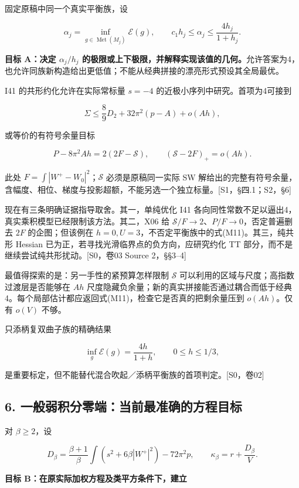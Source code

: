 \documentclass[UTF8,a4paper,11pt,fontset=fandol]{ctexart}
\begin{document}
固定原稿中同一个真实平衡族，设

\[
\alpha_j=\inf_{g\in\operatorname{Met}(M_j)}\mathcal E(g),\qquad
c_1h_j\le\alpha_j\le\frac{4h_j}{1+h_j}.
\]

\textbf{目标 A：决定 \(\alpha_j/h_j\)
的极限或上下极限，并解释实现该值的几何。}允许答案为4，也允许同族新构造给出更低值；不能从经典拼接的漂亮形式预设其全局最优。

I41 的共形约化允许在实际常标量 \(s=-4\)
的近极小序列中研究。首项为4可接到

\[
\Sigma\le\frac89D_2+32\pi^2(p-A)+o(Ah),
\tag{M10}
\]

或等价的有符号余量目标

\[
P-8\pi^2Ah=2(2F-\mathscr S),
\qquad
\boxed{(\mathscr S-2F)_+=o(Ah)}.
\tag{M11}
\]

此处 \(F=\int|W^+-W_0|^2\)；\(\mathscr S\) 必须是原稿同一实际 SW
解给出的完整有符号余量，含幅度、相位、梯度与投影超额，不能另选一个独立标量。{[}S1，§四.1；S2，§6{]}

现在有三条明确证据指导取舍。其一，单纯优化 I41
各向同性常数不足以逼出4，真实乘积模型已经限制该方法。其二，X06 给
\(\mathscr S/F\to2\)、\(P/F\to0\)，否定普遍删去 \(2F\) 的企图；但该例在
\(h=0,U=3\)，不否定平衡族中的式(M11)。其三，纯共形 Hessian
已为正，若寻找光滑临界点的负方向，应研究约化 TT
部分，而不是继续尝试纯共形扰动。{[}S0，卷03 Source 2，§§3--4{]}

最值得探索的是：另一手性的紧预算怎样限制 \(\mathscr S\)
可以利用的区域与尺度；高指数过渡层是否能够在 \(Ah\)
尺度隐藏负余量；新的真实拼接能否通过耦合而低于经典4。每个局部估计都应返回式(M11)，检查它是否真的把剩余量压到
\(o(Ah)\)。仅有 \(o(V)\) 不够。

只添柄复双曲子族的精确结果

\[
\inf_g\mathcal E(g)=\frac{4h}{1+h},\qquad0\le h\le1/3,
\]

是重要标定，但不能替代混合吹起／添柄平衡族的首项判定。{[}S0，卷02{]}

\subsection{6.
一般弱积分零端：当前最准确的方程目标}\label{ux4e00ux822cux5f31ux79efux5206ux96f6ux7aefux5f53ux524dux6700ux51c6ux786eux7684ux65b9ux7a0bux76eeux6807}

对 \(\beta\ge2\)，设

\[
D_\beta=\frac{\beta+1}{\beta}
\int(s^2+6\beta|W^+|^2)-72\pi^2p,
\qquad\kappa_\beta=r+\frac{D_\beta}{V}.
\]

\textbf{目标 B：在原实际加权方程及类平方条件下，建立}
\end{document}
